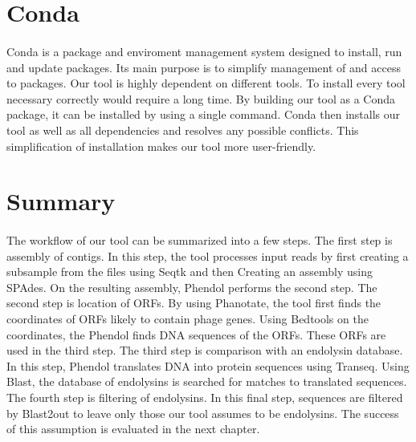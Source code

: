 \section{Conda}
\paragraph*{}
Conda\cite{yan2018hands} is a package and enviroment management system designed to install, run and update packages. Its main purpose is to simplify management of and access to packages. Our tool is highly dependent on different tools. To install every tool necessary correctly would require a long time. By building our tool as a Conda package, it can be installed by using a single command. Conda then installs our tool as well as all dependencies and resolves any possible conflicts. This simplification of installation makes our tool more user-friendly.

\section{Summary}
\paragraph*{}
The workflow of our tool can be summarized into a few steps. The first step is assembly of contigs. In this step, the tool processes input reads by first creating a subsample from the files using Seqtk and then Creating an assembly using SPAdes. On the resulting assembly, Phendol performs the second step. The second step is location of ORFs. By using Phanotate, the tool first finds the coordinates of ORFs likely to contain phage genes. Using Bedtools on the coordinates, the Phendol finds DNA sequences of the ORFs. These ORFs are used in the third step. The third step is comparison with an endolysin database. In this step, Phendol translates DNA into protein sequences using Transeq. Using Blast, the database of endolysins is searched for matches to translated sequences. The fourth step is filtering of endolysins. In this final step, sequences are filtered by Blast2out to leave only those our tool assumes to be endolysins. The success of this assumption is evaluated in the next chapter.